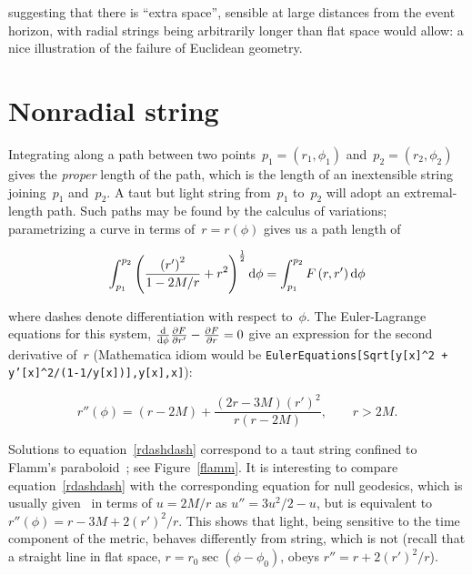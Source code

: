 \documentclass[review]{elsarticle}
\begin{document}
\noindent suggesting that there is ``extra space'', sensible at large
distances from the event horizon, with radial strings being
arbitrarily longer than flat space would allow: a nice illustration of
the failure of Euclidean geometry.

\section{Nonradial string}
Integrating along a path between two
points~$p_1=\left(r_1,\phi_1\right)$ and~$p_2=\left(r_2,\phi_2\right)$
gives the {\em proper} length of the path, which is the length of an
inextensible string joining~$p_1$ and~$p_2$.  A taut but light string
from~$p_1$ to~$p_2$ will adopt an extremal-length path.  Such paths
may be found by the calculus of variations; parametrizing a curve in
terms of~$r=r\left(\phi\right)$ gives us a path length of


\begin{equation}
  \int_{p_1}^{p_2}\left(\frac{\left(r'\right)^2}{1-2M/r} + r^2\right)^\frac{1}{2}\mathrm{d}\phi=
  \int_{p_1}^{p_2}F\left(r,r'\right)\mathrm{d}\phi
\end{equation}

\noindent where dashes denote differentiation with respect to~$\phi$.
The Euler-Lagrange equations for this system,
$\frac{\mathrm{d}}{\mathrm{d}\phi}\frac{\partial F}{\partial r'}-\frac{\partial
  F}{\partial r}=0$ give an expression for the second derivative
of~$r$ (Mathematica idiom would be {\tt EulerEquations[Sqrt[y[x]\^{}2
      + y'[x]\^{}2/(1-1/y[x])],y[x],x]}):

\begin{equation}\label{rdashdash}
  r''\left(\phi\right) =
  (r-2M) + \frac{(2r-3M)\left(r'\right)^2}{r\left(r-2M\right)},\qquad r>2M.
\end{equation}

\noindent Solutions to equation~\ref{rdashdash} correspond to a taut
string confined to Flamm's paraboloid~\cite{flamm1916}; see
Figure~\ref{flamm}.  It is interesting to compare
equation~\ref{rdashdash} with the corresponding equation for null
geodesics, which is usually given~\cite{wald} in terms of $u=2M/r$ as
$u''=3u^2/2-u$, but is equivalent
to~$r''\left(\phi\right)=r-3M+2\left(r'\right)^2/r$.  This shows that
light, being sensitive to the time component of the metric, behaves
differently from string, which is not (recall that a straight line in
flat space, $r=r_0\sec\left(\phi-\phi_0\right)$, obeys
$r''=r+2\left(r'\right)^2/r$).
\end{document}
